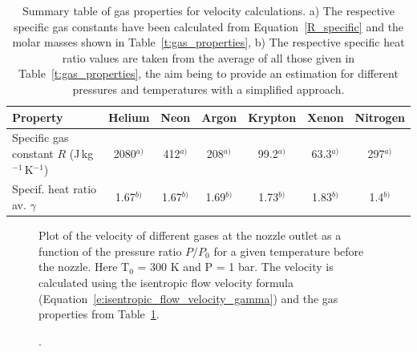 \documentclass[../main]{subfiles}
\begin{document}
\vspace{0mm}
    \begin{table}[H]
        \centering
       \begin{tabular}{l c c c c c c}
\toprule
            \textbf{Property}     &      \textbf{Helium}     &      \textbf{Neon}          &        \textbf{Argon}    &  \textbf{Krypton} & \textbf{Xenon} & \textbf{Nitrogen}   \\                
\midrule
\makecell[l]{Specific gas constant \\ $R$ (J\,kg$^{-1}$\,K$^{-1}$)} & 2080$^{a)}$ & 412$^{a)}$ & 208$^{a)}$ & 99.2$^{a)}$ & 63.3$^{a)}$ & 297$^{a)}$ \\
\makecell[l]{Specif. heat ratio av. \\ $\gamma$}  & 1.67$^{b)}$  &   1.67$^{b)}$  &   1.69$^{b)}$ & 1.73$^{b)}$ & 1.83$^{b)}$ & 1.4$^{b)}$ \\               
\bottomrule
                        \end{tabular}
        \caption[Summary table of gas properties for velocity calculations]{Summary table of gas properties for velocity calculations. a) The respective specific gas constants have been calculated from Equation~\ref{R_specific} and the molar masses shown in Table~\ref{t:gas_properties}, b) The respective specific heat ratio values are taken from the average of all those given in Table~\ref{t:gas_properties}, the aim being to provide an estimation for different pressures and temperatures with a simplified approach.}
        \label{t:gas_properties_velocity}
    \end{table}
\FloatBarrier
\vspace{0mm}



\vspace{0mm}
\begin{figure}[H]
    \centering
        
        \caption[Plot of the velocity of different gases at the nozzle outlet as a function of the pressure ratio $P/P_0$ for a given temperature before the nozzle]. {Plot of the velocity of different gases at the nozzle outlet as a function of the pressure ratio $P/P_0$ for a given temperature before the nozzle. Here T$_0$ = 300 K and P = 1 bar. The velocity is calculated using the isentropic flow velocity formula (Equation~\ref{e:isentropic_flow_velocity_gamma}) and the gas properties from Table~\ref{t:gas_properties_velocity}.}
        \label{f:velocity_nozzle_out}
\end{figure}
\FloatBarrier
\vspace{0mm}
\end{document}
